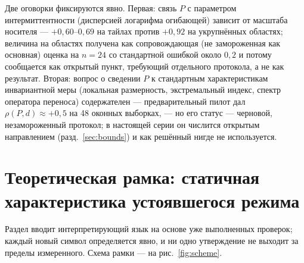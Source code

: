 \documentclass[11pt,a4paper]{article}
\begin{document}
Две оговорки фиксируются явно. Первая: связь $P$ с параметром интермиттентности (дисперсией логарифма огибающей) зависит от масштаба носителя --- $+0{,}60$--$0{,}69$ на тайлах против $+0{,}92$ на укрупнённых областях; величина на областях получена как сопровождающая (не замороженная как основная) оценка на $n=24$ со стандартной ошибкой около $0{,}2$ и потому сообщается как открытый пункт, требующий отдельного протокола, а не как результат. Вторая: вопрос о сведении $P$ к стандартным характеристикам инвариантной меры (локальная размерность, экстремальный индекс, спектр оператора переноса) содержателен --- предварительный пилот дал $\rho(P,d)\approx+0{,}5$ на 48 оконных выборках, --- но его статус --- черновой, незамороженный протокол; в настоящей серии он числится открытым направлением (разд.~\ref{sec:bounds}) и как решённый нигде не используется.

\section{Теоретическая рамка: статичная характеристика устоявшегося режима}
\label{sec:frame}

Раздел вводит интерпретирующий язык на основе уже выполненных проверок; каждый новый символ определяется явно, и ни одно утверждение не выходит за пределы измеренного. Схема рамки --- на рис.~\ref{fig:scheme}.
\end{document}
